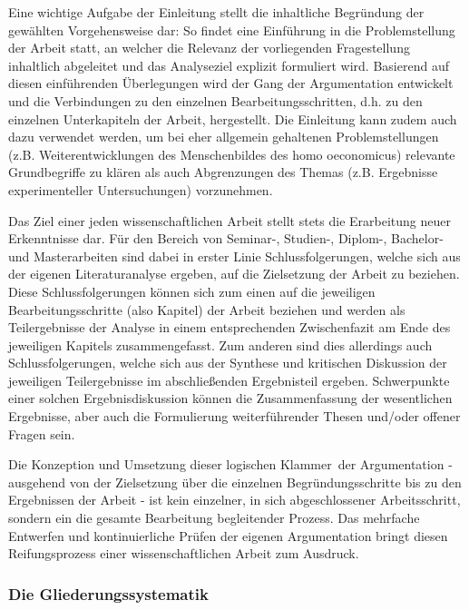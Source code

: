 \documentclass[a4paper, 12pt]{article}
\begin{document}
Eine wichtige Aufgabe der Einleitung stellt die inhaltliche Begr\"{u}ndung der gew\"{a}hlten
Vorgehensweise dar: So findet eine Einf\"{u}hrung in die Problemstellung der Arbeit
statt, an welcher die Relevanz der vorliegenden Fragestellung inhaltlich abgeleitet
und das Analyseziel  explizit formuliert wird. Basierend auf diesen einf\"{u}hrenden
\"{U}berlegungen wird der Gang der Argumentation entwickelt und die Verbindungen zu den
einzelnen Bearbeitungsschritten, d.h. zu den einzelnen  Unterkapiteln der Arbeit,
hergestellt. Die Einleitung kann zudem auch dazu verwendet werden, um bei eher
allgemein gehaltenen Problemstellungen (z.B. Weiterentwicklungen des Menschenbildes
des homo oeconomicus) relevante Grundbegriffe zu kl\"{a}ren als auch Abgrenzungen des
Themas (z.B. Ergebnisse experimenteller Untersuchungen) vorzunehmen.

Das Ziel einer jeden wissenschaftlichen Arbeit stellt stets die Erarbeitung neuer
Erkenntnisse dar. F\"{u}r den Bereich von Seminar-, Studien-, Diplom-, Bachelor- und
Masterarbeiten sind dabei in erster Linie Schlussfolgerungen, welche sich aus der
eigenen Literaturanalyse ergeben, auf die Zielsetzung der Arbeit zu beziehen. Diese
Schlussfolgerungen k\"{o}nnen sich zum einen auf die jeweiligen Bearbeitungsschritte
(also Kapitel) der Arbeit beziehen und werden als Teilergebnisse der Analyse in
einem entsprechenden Zwischenfazit am Ende des jeweiligen Kapitels zusammengefasst.
Zum anderen sind dies allerdings auch Schlussfolgerungen, welche sich aus der
Synthese und kritischen Diskussion der jeweiligen Teilergebnisse im abschlie\ss enden
Ergebnisteil ergeben. Schwerpunkte einer solchen Ergebnisdiskussion k\"{o}nnen die
Zusammenfassung der wesentlichen Ergebnisse, aber auch die Formulierung
weiterf\"{u}hrender Thesen und/oder offener Fragen sein.

Die Konzeption und Umsetzung dieser logischen \glqq Klammer\grqq\ der Argumentation
- ausgehend von der Zielsetzung \"{u}ber die einzelnen Begr\"{u}ndungsschritte bis zu den
Ergebnissen der Arbeit - ist kein einzelner, in sich abgeschlossener Arbeitsschritt,
sondern ein die gesamte Bearbeitung begleitender Prozess. Das mehrfache Entwerfen
und kontinuierliche Pr\"{u}fen der eigenen Argumentation bringt diesen Reifungsprozess
einer wissenschaftlichen Arbeit zum Ausdruck.

\subsubsection{Die Gliederungssystematik}\label{Gliederungssystematik}
\end{document}
